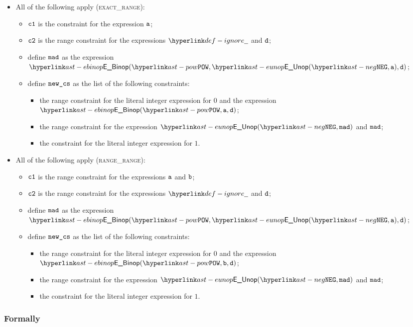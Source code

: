 \begin{itemize}
  \item All of the following apply (\textsc{exact\_range}):
  \begin{itemize}
    \item $\vcone$ is the constraint for the expression $\va$;
    \item $\vctwo$ is the range constraint for the expressions $\Ignore$ and $\vd$;
    \item define $\vmad$ as the expression $\EBinop(\POW, \EUnop(\NEG, \va), \vd)$;
    \item define $\newcs$ as the list of the following constraints:
    \begin{itemize}
      \item the range constraint for the literal integer expression for $0$ and the expression
            $\EBinop(\POW, \va, \vd)$;
      \item the range constraint for the expression $\EUnop(\NEG, \vmad)$ and $\vmad$;
      \item the constraint for the literal integer expression for $1$.
    \end{itemize}
  \end{itemize}

  \item All of the following apply (\textsc{range\_range}):
  \begin{itemize}
    \item $\vcone$ is the range constraint for the expressions $\va$ and $\vb$;
    \item $\vctwo$ is the range constraint for the expressions $\Ignore$ and $\vd$;
    \item define $\vmad$ as the expression $\EBinop(\POW, \EUnop(\NEG, \va), \vd)$;
    \item define $\newcs$ as the list of the following constraints:
    \begin{itemize}
      \item the range constraint for the literal integer expression for $0$ and the expression
            $\EBinop(\POW, \vb, \vd)$;
      \item the range constraint for the expression $\EUnop(\NEG, \vmad)$ and $\vmad$;
      \item the constraint for the literal integer expression for $1$.
    \end{itemize}
  \end{itemize}
\end{itemize}

\subsubsection{Formally}
\begin{mathpar}
\end{mathpar}


